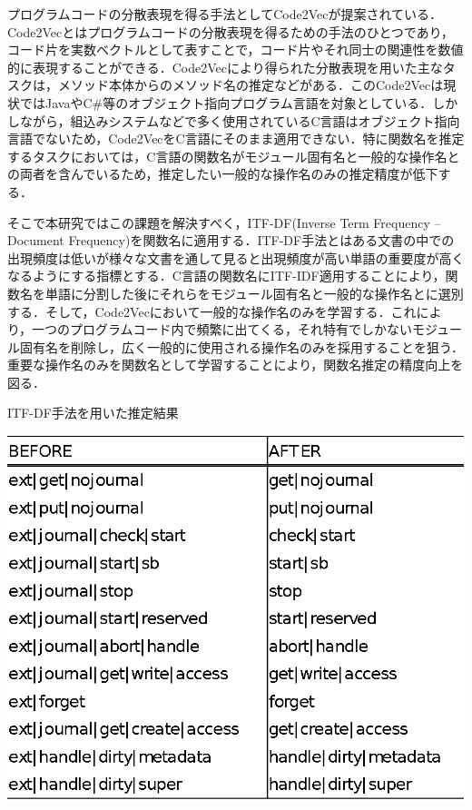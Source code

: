 \documentclass[submit,techrep,noauthor]{ipsj}
\begin{document}
プログラムコードの分散表現を得る手法としてCode2Vec\cite{alon2019code2vec}が提案されている．Code2Vecとはプログラムコードの分散表現を得るための手法のひとつであり，コード片を実数ベクトルとして表すことで，コード片やそれ同士の関連性を数値的に表現することができる．Code2Vecにより得られた分散表現を用いた主なタスクは，メソッド本体からのメソッド名の推定などがある．このCode2Vecは現状ではJavaやC\#等のオブジェクト指向プログラム言語を対象としている．しかしながら，組込みシステムなどで多く使用されているC言語はオブジェクト指向言語でないため，Code2VecをC言語にそのまま適用できない．特に関数名を推定するタスクにおいては，C言語の関数名がモジュール固有名と一般的な操作名との両者を含んでいるため，推定したい一般的な操作名のみの推定精度が低下する．

そこで本研究ではこの課題を解決すべく，ITF-DF(Inverse Term Frequency – Document Frequency)を関数名に適用する．ITF-DF手法とはある文書の中での出現頻度は低いが様々な文書を通して見ると出現頻度が高い単語の重要度が高くなるようにする指標とする．C言語の関数名にITF-IDF適用することにより，関数名を単語に分割した後にそれらをモジュール固有名と一般的な操作名とに選別する．そして，Code2Vecにおいて一般的な操作名のみを学習する．これにより，一つのプログラムコード内で頻繁に出てくる，それ特有でしかないモジュール固有名を削除し，広く一般的に使用される操作名のみを採用することを狙う．重要な操作名のみを関数名として学習することにより，関数名推定の精度向上を図る．

\begin{table}[t]
 \centering
 \caption{ITF-DF手法を用いた推定結果}
 \includegraphics[width=1.0\hsize]{image/ITF-DFcompare.eps} 
 \label{table1} 
\end{table}
\end{document}
